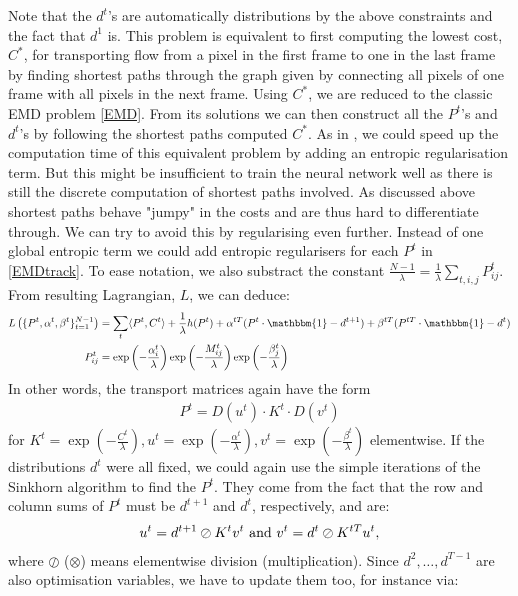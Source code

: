\documentclass{article}
\begin{document}
Note that the $d^t$'s are automatically distributions by the above constraints and the fact that $d^1$ is. This problem is equivalent to first computing the lowest cost, $C^*$, for transporting flow from a pixel in the first frame to one in the last frame by finding shortest paths through the graph given by connecting all pixels of one frame with all pixels in the next frame. Using $C^*$, we are reduced to the classic EMD problem \ref{EMD}. From its solutions we can then construct all the $P^t$'s and $d^t$'s by following the shortest paths computed $C^*$. As in \cite{Cut13}, we could speed up the computation time of this equivalent problem by adding an entropic regularisation term. But this might be insufficient to train the neural network well as there is still the discrete computation of shortest paths involved. As discussed above shortest paths behave "jumpy" in the costs and are thus hard to differentiate through. We can try to avoid this by regularising even further. Instead of one global entropic term we could add entropic regularisers for each $P^t$ in \ref{EMDtrack}. To ease notation, we also substract the  constant $\frac{N-1}{\lambda} = \frac{1}{\lambda} \sum_{t, i, j} P^t_{ij}$. From resulting Lagrangian, $L$, we can deduce:
\begin{align}
L\left(\{P^t, \alpha^t, \beta^t\}_{t=1}^{N-1}\right)&= \sum_{t} \langle P^t, C^t \rangle + \frac{1}{\lambda} h(P^t) + \alpha^{t T} (P^t\cdot \mathbbm{1}- d^{t+1}) + \beta^{t T}(P^{tT} \cdot \mathbbm{1} - d^t) \\
P^t_{ij} &= \exp\left(-\frac{\alpha_i^t}{\lambda}\right) \exp\left(-\frac{M^t_{ij}}{\lambda}\right) \exp\left(- \frac{\beta_j^t}{\lambda}\right)
\end{align}
In other words, the transport matrices again have the form
\begin{align*}
P^t = D(u^t)\cdot K^t \cdot D(v^t) 
\end{align*}
for $K^t = \exp\left(-\frac{C^t}{\lambda}\right), u^t = \exp\left(-\frac{\alpha^t}{\lambda}\right), v^t =\exp\left(- \frac{\beta^t}{\lambda}\right)$ elementwise. If the distributions $d^t$ were all fixed, we could again use the simple iterations of the Sinkhorn algorithm \cite{Sink67} to find the $P^t$. They come from the fact that the row and column sums of $P^t$ must be $d^{t+1}$ and $d^t$, respectively, and are:
\begin{align}\label{SinkhornIter}
u^t = d^{t+1} \oslash K^t v^t \textnormal{ and } v^t = d^t \oslash K^{tT} u^t,
\end{align}
where $\oslash$ ($\otimes$) means elementwise division (multiplication). Since $d^2, \dots, d^{T-1}$ are also optimisation variables, we have to update them too, for instance via:
\end{document}

